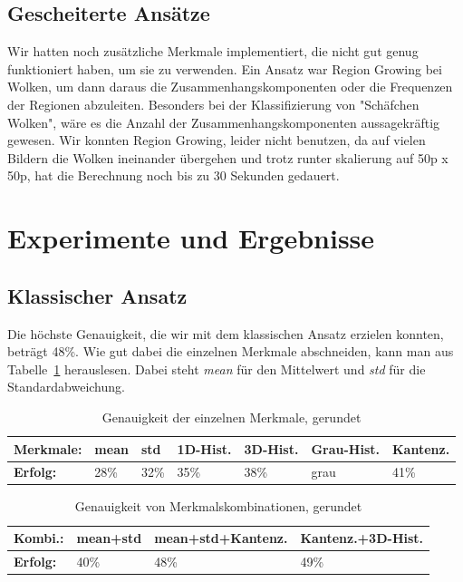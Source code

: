 \documentclass[a4,german]{article}
\begin{document}
\subsection{Gescheiterte Ansätze}
Wir hatten noch zusätzliche Merkmale implementiert, die nicht gut genug funktioniert haben, um sie zu verwenden.
Ein Ansatz war Region Growing bei Wolken, um dann daraus die Zusammenhangskomponenten oder die Frequenzen der Regionen abzuleiten.
Besonders bei der Klassifizierung von  "Schäfchen Wolken", wäre es die Anzahl der Zusammenhangskomponenten aussagekräftig gewesen.
Wir konnten Region Growing, leider nicht benutzen, da auf vielen Bildern die Wolken ineinander übergehen und trotz runter skalierung auf 50p x 50p, hat die Berechnung noch bis zu 30 Sekunden gedauert.



\section{Experimente und Ergebnisse}

\subsection{Klassischer Ansatz}%
Die höchste Genauigkeit, die wir mit dem klassischen Ansatz erzielen konnten, beträgt 48\%. Wie gut dabei die einzelnen Merkmale abschneiden, kann man aus Tabelle~\ref{tab:gen} herauslesen. Dabei steht \textit{mean} für den Mittelwert und \textit{std} für die Standardabweichung. 
\begin{table}[h]
\begin{tabular}{|l|l|l|l|l|l|l|}
 \hline
 \textbf{Merkmale:}&mean&std&1D-Hist.&3D-Hist.&Grau-Hist.&Kantenz.\\
 \hline
 \textbf{Erfolg:} & 28\% & 32\% & 35\% & 38\% & grau & 41\% \\
 \hline
\end{tabular}
\caption{Genauigkeit der einzelnen Merkmale, gerundet}
\label{tab:gen}
\end{table}

\begin{table}[h]
\begin{tabular}{|l|l|l|l|}
 \hline
 \textbf{Kombi.:}&mean+std&mean+std+Kantenz.&Kantenz.+3D-Hist.\\
 \hline
 \textbf{Erfolg:} & 40\% & 48\% & 49\% \\
 \hline
\end{tabular}
\caption{Genauigkeit von Merkmalskombinationen, gerundet}
\label{tab:gen2}
\end{table}
\end{document}
